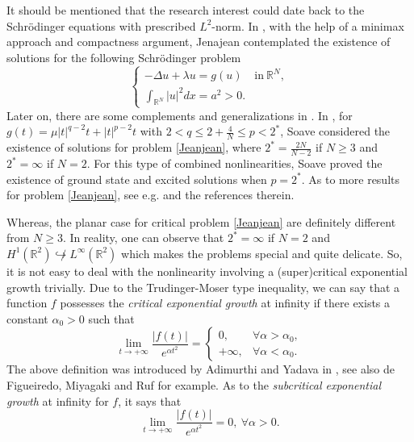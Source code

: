 \documentclass[11pt]{amsart}
\numberwithin{equation}{section}
\theoremstyle{definition}
\newcommand{\R}{\mathbb{R}}
\begin{document}
It should be mentioned that the research interest could date back to the Schr\"{o}dinger equations with prescribed $L^2$-norm.
In \cite{Jeanjean1997}, with the help of a minimax approach and compactness argument,
Jenajean contemplated the existence of solutions for the following Schr\"{o}dinger
problem
\begin{equation}\label{Jeanjean}
	\left\{
	\begin{array}{ll}
		\displaystyle   -\Delta u+\lambda u=
		g(u) &\text{in}~ \R^N, \\
		\displaystyle     \int_{\R^N}|u|^2dx=a^2>0.
	\end{array}
	\right.
\end{equation}
Later on, there are some complements and generalizations in \cite{JeanjeanLu2}.
In \cite{Soave1}, for $g(t)=\mu|t|^{q-2}t+|t|^{p-2}t$ with $2<q\leq 2+\frac4N\leq p<2^*$,
Soave considered the existence of solutions for problem \eqref{Jeanjean},
where $2^*=\frac{2N}{N-2}$ if $N\geq3$ and $2^*=\infty$ if $N=2$.
For this type of combined nonlinearities, Soave \cite{Soave2} proved
the existence of ground state and excited solutions when $p=2^*$.
As to more results for problem \eqref{Jeanjean}, see e.g.
\cite{BartschSoave,JeanjeanLu1,JeanjeanLu3,LiXinfu,WeiWu} and the references therein.

Whereas, the planar case for critical problem \eqref{Jeanjean}
are definitely different from $N\geq3$.
In reality, one can observe that $2^*=\infty$ if $N=2$ and
$H^1(\R^2)\not\hookrightarrow L^\infty(\R^2)$ which makes the problems special and quite delicate.
So, it is not easy to deal with the nonlinearity involving
a (super)critical exponential growth trivially.
Due to the Trudinger-Moser type inequality, we can say that a function $f$ possesses the
\emph{critical exponential growth} at infinity if there exists a constant $\alpha_{0}>0$ such that
\begin{equation}\label{definitioncriticalgrowth}
	\lim _{t \rightarrow+\infty} \frac{|f(t)|}{e^{\alpha t^{2}}}= \begin{cases}0,
		& \forall \alpha>\alpha_{0}, \\ +\infty, & \forall \alpha<\alpha_{0}.\end{cases}
\end{equation}
The above definition was introduced by Adimurthi and Yadava in \cite{AYA}, see also de Figueiredo, Miyagaki
and Ruf \cite{Figueiredo} for example.
As to the \emph{subcritical exponential growth} at infinity for $f$, it says that
\begin{equation}\label{definitionsubcriticalgrowth}
	\lim _{t \rightarrow+\infty} \frac{|f(t)|}{e^{\alpha t^{2}}}=0,~\forall \alpha>0.
\end{equation}
\end{document}
